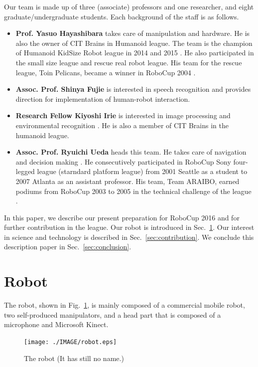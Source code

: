 \documentclass{llncs}
\begin{document}
Our team is made up of three (associate) professors and
one researcher, and eight graduate/undergraduate students.
Each background of the staff is as follows.
\begin{itemize}
	\item \textbf{Prof. Yasuo Hayashibara}
		takes care of manipulation and hardware.
		He is also the owner of CIT Brains in Humanoid league. 
		The team is the champion of Humanoid KidSize Robot league
		in 2014 \cite{hayashibara2015} and 2015 \cite{hayashibara2016}.
		He also participated in the small size league and rescue
		real robot league. His team for the rescue league,
		Toin Pelicans, became a winner in RoboCup 2004 \cite{lima2005}.
	\item \textbf{Assoc. Prof. Shinya Fujie} is interested in speech recognition
		\cite{fujie2009,matsuyama2015} and provides direction for implementation
		of human-robot interaction.
	\item \textbf{Research Fellow Kiyoshi Irie} is interested in image processing and
		environmental recognition \cite{irie2013,irie2015}. He is also a member
		of CIT Brains in the humanoid league.
	\item \textbf{Assoc. Prof. Ryuichi Ueda} heads this team.
		He takes care of navigation and decision making \cite{ueda2015}.
		He consecutively participated in RoboCup Sony four-legged league
		(starndard platform league)
		from 2001 Seattle \cite{arai2002tdp}
		as a student to 2007 Atlanta as an assistant professor.
		His team, Team ARAIBO, earned podiums from RoboCup 2003 to 2005
		in the technical challenge of the league \cite{pagello2004,lima2005}.
\end{itemize}

In this paper, we describe our present preparation for
RoboCup 2016 and for further contribution in the league.
Our robot is introduced in Sec.~\ref{sec:robot}.
Our interest in science and technology is
described in Sec.~\ref{sec:contribution}.
We conclude this description paper in Sec.~\ref{sec:conclusion}.

\section{Robot}\label{sec:robot}
The robot, shown in Fig.~\ref{fig:robot},
is mainly composed of a commercial mobile robot,
two self-produced manipulators, and a head part that is composed of
a microphone and Microsoft Kinect.

\begin{figure}[h]
	\begin{center}
		\texttt{[image: ./IMAGE/robot.eps]}
		\caption{The robot (It has still no name.)}
		\label{fig:robot}
	\end{center}
\end{figure}
\end{document}
